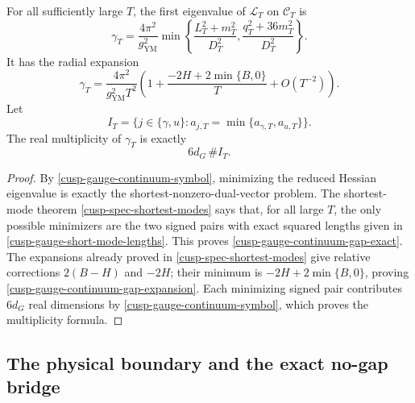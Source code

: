 \begin{theorem}
\label{cusp-gauge-continuum-gap}
For all sufficiently large \(T\), the first eigenvalue of
\(\mathcal L_T\) on \(\mathscr C_T\) is
\begin{equation}
 \gamma_T
 =\frac{4\pi^2}{g_{\mathrm{YM}}^2}
 \min\left\{
   \frac{L_T^2+m_T^2}{D_T^2},
   \frac{q_T^2+36m_T^2}{D_T^2}
 \right\}.
 \label{cusp-gauge-continuum-gap-exact}
\end{equation}
It has the radial expansion
\begin{equation}
 \gamma_T
 =\frac{4\pi^2}{g_{\mathrm{YM}}^2T^2}
 \left(
  1+\frac{-2H+2\min\{B,0\}}T+O(T^{-2})
 \right).
 \label{cusp-gauge-continuum-gap-expansion}
\end{equation}
Let
\[
 I_T=\{j\in\{\gamma,u\}:a_{j,T}
             =\min\{a_{\gamma,T},a_{u,T}\}\}.
\]
The real multiplicity of \(\gamma_T\) is exactly
\begin{equation}
 6d_G\,\#I_T.
 \label{cusp-gauge-continuum-gap-multiplicity}
\end{equation}
\end{theorem}

\begin{proof}
By \cref{cusp-gauge-continuum-symbol}, minimizing the reduced Hessian
eigenvalue is exactly the shortest-nonzero-dual-vector problem.  The
shortest-mode theorem
\cref{cusp-spec-shortest-modes} says that, for all large \(T\), the only
possible minimizers are the two signed pairs with exact squared lengths
given in \cref{cusp-gauge-short-mode-lengths}.  This proves
\cref{cusp-gauge-continuum-gap-exact}.  The expansions already proved in
\cref{cusp-spec-shortest-modes} give relative corrections
\(2(B-H)\) and \(-2H\); their minimum is
\(-2H+2\min\{B,0\}\), proving
\cref{cusp-gauge-continuum-gap-expansion}.  Each minimizing signed pair
contributes \(6d_G\) real dimensions by
\cref{cusp-gauge-continuum-symbol}, which proves the multiplicity formula.
\end{proof}

\subsection{The physical boundary and the exact no-gap bridge}
\label{cusp-gauge-physical-boundary-subsection}

